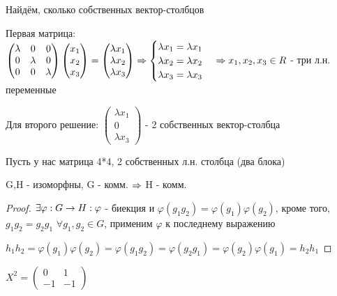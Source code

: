 \documentclass[12pt, fleqn]{article}
\begin{document}
\begin{example}
    Найдём, сколько собственных вектор-столбцов

    Первая матрица:
    $\begin{pmatrix}
    \lambda & 0 & 0\\
    0 & \lambda & 0\\
    0 & 0 & \lambda
    \end{pmatrix}
    \begin{pmatrix}
    x_1\\
    x_2\\
    x_3
    \end{pmatrix}
    =
    \begin{pmatrix}
    \lambda x_1\\
    \lambda x_2\\
    \lambda x_3
    \end{pmatrix}
    \Rightarrow
    \begin{cases}
    \lambda x_1=\lambda x_1\\
    \lambda x_2=\lambda x_2\\
    \lambda x_3=\lambda x_3
    \end{cases}
    \Rightarrow
    x_1,x_2,x_3 \in R
    $ - три л.н. переменные

    Для второго решение:
    $\begin{pmatrix}
    \lambda x_1\\
    0\\
    \lambda x_3
    \end{pmatrix}$ - 2 собственных вектор-столбца
\end{example}


\begin{example}
    Пусть у нас матрица 4*4, 2 собственных л.н. столбца (два блока)
\end{example}

\begin{utv}
    G,H - изоморфны, G - комм. $\Rightarrow$ H - комм.
\end{utv}

\begin{proof}
    $\exists \varphi: G \rightarrow H: \varphi$ - биекция и $\varphi(g_1 g_2)=\varphi(g_1) \varphi(g_2)$, кроме того, $g_1 g_2=g_2 g_1$ $\forall g_1, g_2 \in G$, применим $\varphi$ к последнему выражению

    $h_1 h_2=\varphi(g_1) \varphi(g_2)=\varphi(g_1 g_2)=\varphi(g_2 g_1)=\varphi(g_2) \varphi(g_1)= h_2 h_1$
\end{proof}

\begin{homework}
    $X^2=\begin{pmatrix}
    0 & 1\\
    -1 & -1
    \end{pmatrix}$
\end{homework}
\end{document}

